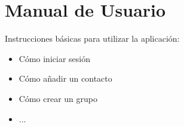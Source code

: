 \section*{Manual de Usuario}

Instrucciones básicas para utilizar la aplicación:
\begin{itemize}
    \item Cómo iniciar sesión
    \item Cómo añadir un contacto
    \item Cómo crear un grupo
    \item ...
\end{itemize}
